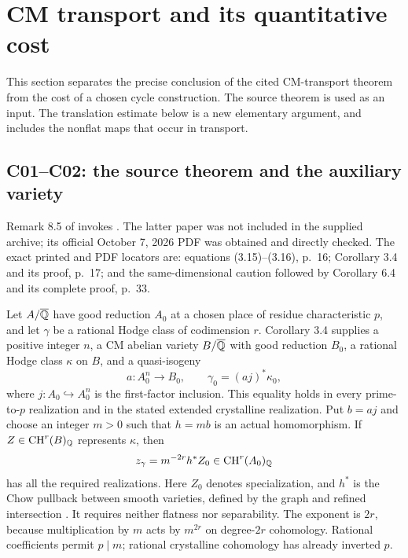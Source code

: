 \section{CM transport and its quantitative cost}
\label{sec:transport}

This section separates the precise conclusion of the cited CM-transport theorem from the cost of a chosen cycle construction. The source theorem is used as an input. The translation estimate below is a new elementary argument, and includes the nonflat maps that occur in transport.

\subsection{C01--C02: the source theorem and the auxiliary variety}

Remark 8.5 of \cite[pp.~50--51]{OAI032} invokes \cite[Corollaries 3.4 and 6.4]{OAI001}. The latter paper was not included in the supplied archive; its official October 7, 2026 PDF was obtained and directly checked. The exact printed and PDF locators are: equations (3.15)--(3.16), p.~16; Corollary 3.4 and its proof, p.~17; and the same-dimensional caution followed by Corollary 6.4 and its complete proof, p.~33.

Let $A/\overline{\mathbb Q}$ have good reduction $A_0$ at a chosen place of residue characteristic $p$, and let $\gamma$ be a rational Hodge class of codimension $r$. Corollary 3.4 supplies a positive integer $n$, a CM abelian variety $B/\overline{\mathbb Q}$ with good reduction $B_0$, a rational Hodge class $\kappa$ on $B$, and a quasi-isogeny
\[
a:A_0^n\longrightarrow B_0,
\qquad \gamma_0=(aj)^*\kappa_0,
\]
where $j:A_0\hookrightarrow A_0^n$ is the first-factor inclusion. This equality holds in every prime-to-$p$ realization and in the stated extended crystalline realization. Put $b=aj$ and choose an integer $m>0$ such that $h=mb$ is an actual homomorphism. If $Z\in\operatorname{CH}^r(B)_{\mathbb Q}$ represents $\kappa$, then
\begin{equation}
z_\gamma=m^{-2r}h^*Z_0\in\operatorname{CH}^r(A_0)_{\mathbb Q}
\label{eq:cm-source-cycle}
\end{equation}
has all the required realizations. Here $Z_0$ denotes specialization, and $h^*$ is the Chow pullback between smooth varieties, defined by the graph and refined intersection \cite{Fulton}. It requires neither flatness nor separability. The exponent is $2r$, because multiplication by $m$ acts by $m^{2r}$ on degree-$2r$ cohomology. Rational coefficients permit $p\mid m$; rational crystalline cohomology has already inverted $p$.

